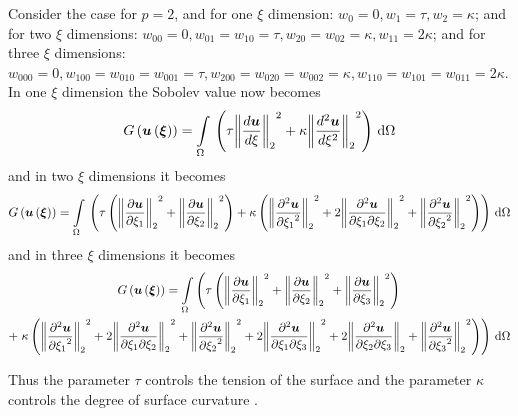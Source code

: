 Consider the case for $p=2$, and for one $\xi$ dimension: $w_{0}=0,
w_{1}=\tau, w_{2}=\kappa$; and for two $\xi$ dimensions: $w_{00}=0,
w_{01}=w_{10}=\tau, w_{20}=w_{02}= \kappa, w_{11}=2\kappa$; and for three
$\xi$ dimensions: $w_{000}=0, w_{100}=w_{010}=w_{001}=\tau,
w_{200}=w_{020}=w_{002}= \kappa, w_{110}=w_{101}=w_{011}=2\kappa$. In one
$\xi$ dimension the Sobolev value now becomes
\begin{equation}
  \fnof{G}{\fnof{\vectr{u}}{\vectr{\xi}}}=\goneint{\pbrac{\tau
      \norm{\dby{\vectr{u}}{\xi}}^{2}+\kappa\norm{\dtwosqby{
          \vectr{u}}{\xi}}^{2}}}{\Omega}
  \label{eqn:1DptwoSobolevnorm}
\end{equation}
and in two $\xi$ dimensions it becomes
\begin{equation}
  \fnof{G}{\fnof{\vectr{u}}{\vectr{\xi}}}=\goneint{\pbrac{\tau\pbrac{
        \norm{\delby{\vectr{u}}{\xione}}^{2}+\norm{\delby{\vect{u}}
          {\xitwo}}^{2}}+\kappa\pbrac{\norm{\deltwosqby{\vectr{u}}{\xione}}^{2}+
        2\norm{\deltwoby{\vectr{u}}{\xione}{\xitwo}}^{2}+
        \norm{\deltwosqby{\vectr{u}}{\xitwo}}^{2}}}}{\Omega}
  \label{eqn:2DptwoSobolevnorm}
\end{equation}
and in three $\xi$ dimensions it becomes
\begin{multline}
  \fnof{G}{\fnof{\vectr{u}}{\vectr{\xi}}}=\dintl{\Omega}{}\left(\tau\pbrac{
        \norm{\delby{\vectr{u}}{\xione}}^{2}+\norm{\delby{\vect{u}}
          {\xitwo}}^{2}+\norm{\delby{\vect{u}}
          {\xithree}}^{2}}\right. \\
    +\left.\kappa\pbrac{\norm{\deltwosqby{\vectr{u}}{\xione}}^{2}+
        2\norm{\deltwoby{\vectr{u}}{\xione}{\xitwo}}^{2}+
        \norm{\deltwosqby{\vectr{u}}{\xitwo}}^{2}+
        2\norm{\deltwoby{\vectr{u}}{\xione}{\xithree}}^{2}+
        2\norm{\deltwoby{\vectr{u}}{\xitwo}{\xithree}}+
        \norm{\deltwosqby{\vectr{u}}{\xithree}}^{2}}\right)\,\exteriorderivop\Omega
  \label{eqn:3DptwoSobolevnorm}
\end{multline}

Thus the parameter $\tau$ controls the tension of the surface and the
parameter $\kappa$ controls the degree of surface curvature
\citep{terzopoulos:1986}.

